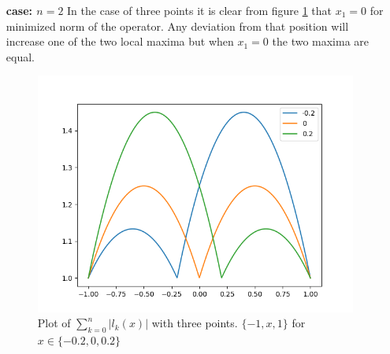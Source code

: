 \begin{solution}
\begin{enumerate}
  \item[{\bf case: $n=2$}] In the case of three points it is clear from figure
    \ref{fig:4n2} that $x_1=0$ for minimized norm of the operator. Any
    deviation from that position will increase one of the two local
    maxima but when $x_1=0$ the two maxima are equal.
    \begin{figure}[!ht]
      \centering \includegraphics[scale = 0.5]{code/task_4_n2.png}
      \caption{Plot of $\sum_{k=0}^n|l_k(x)|$ with three points. $\{-1,
        x, 1\}$ for $x \in \{-0.2, 0, 0.2\}$}
      \label{fig:4n2}
    \end{figure}


\end{enumerate}
\end{solution}
